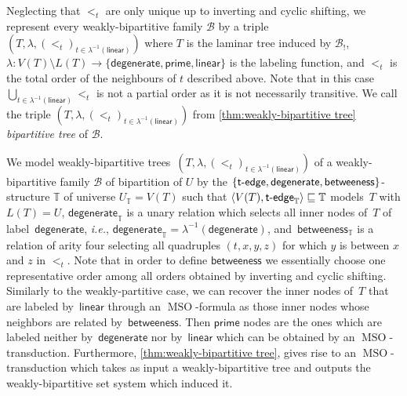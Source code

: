 \documentclass{lmcs} %
\newcommand*\defd[2][\em\color{red!25!black}]{{#1#2}}
\newcommand*\strong[2][\bfseries\mathversion{bold}]{{#1#2}}
\newcommand{\MSO}{\ensuremath{\operatorname{MSO}}\xspace}
\newcommand{\betweeness}{\mathsf{betweeness}}
\newcommand\struct[1]{\ensuremath{\langle#1\rangle}}
\newcommand{\tedge}{\ensuremath{\mathsf{t}\text-\mathsf{edge}}\xspace}
\newcommand\DEGENERATE{\ensuremath{\mathsf{degenerate}}\xspace}
\newcommand\PRIME{\ensuremath{\mathsf{prime}}\xspace}
\newcommand\LINEAR{\ensuremath{\mathsf{linear}}\xspace}
\def\ie{{\em i.e.}}
\begin{document}
Neglecting that $<_t$ are only unique up to inverting and cyclic shifting, we represent every weakly-bipartitive family $\mathcal{B}$ by a triple $(T,\lambda,(<_t)_{t\in \lambda^{-1}(\LINEAR)})$ where $T$ is the laminar tree induced by $\mathcal{B}_!$, $\lambda:V(T)\setminus L(T)\to\{\DEGENERATE,\PRIME,\LINEAR\}$ is the labeling function, and $<_t$ is the total order of the neighbours of $t$ described above. Note that in this case $\bigcup_{t\in\lambda^{-1}(\LINEAR)}<_t$ is not a partial order as it is not necessarily transitive.
We call the triple $(T,\lambda,(<_t)_{t\in \lambda^{-1}(\LINEAR)})$ from \autoref{thm:weakly-bipartitive tree} \defd{\strong{the} bipartitive tree} of $\mathcal{B}$.

We model weakly-bipartitive trees~$(T,\lambda,(<_t)_{t\in \lambda^{-1}(\LINEAR)})$ of a weakly-bipartitive family $\mathcal{B}$ of bipartition of $U$
by the $\{\tedge,\DEGENERATE,\betweeness\}$-structure $\mathbb{T}$
of universe $U_{\mathbb{T}}=V(T)$ such that
$\struct{V(T),\tedge_{\mathbb{T}}}\sqsubseteq\mathbb{T}$ models~$T$ with ${L(T)=U}$,
$\DEGENERATE_{\mathbb{T}}$ is a unary relation
which selects all inner nodes of~$T$ of label~$\DEGENERATE$,
\ie, ${\DEGENERATE_{\mathbb{T}}=\lambda^{-1}(\DEGENERATE)}$,
and~$\betweeness_{\mathbb{T}}$ is a relation of arity four selecting all quadruples $(t,x,y,z)$ for which $y$ is between $x$ and $z$ in $<_t$. Note that in order to define $\betweeness$ we essentially choose one representative order among all orders obtained by inverting and cyclic shifting.
Similarly to the weakly-partitive case, we can recover the inner nodes of~$T$ that are labeled by~$\LINEAR$ through an \MSO-formula as those inner nodes whose neighbors are related by~$\betweeness$.
Then $\PRIME$ nodes are the ones which are labeled neither by~$\DEGENERATE$ nor by~$\LINEAR$ which can be obtained by an $\MSO$-transduction.
Furthermore, \autoref{thm:weakly-bipartitive tree},
gives rise to an \MSO-transduction
which takes as input a weakly-bipartitive tree
and outputs the weakly-bipartitive set system which induced it.
\end{document}
